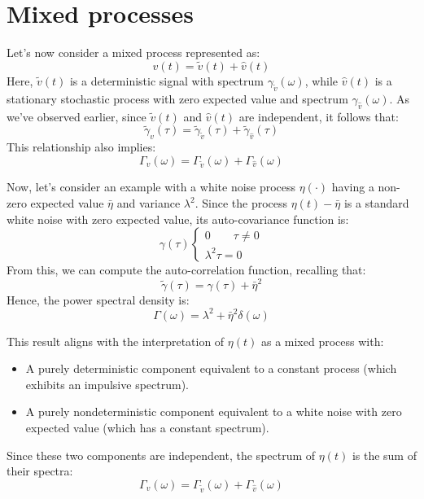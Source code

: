 \section{Mixed processes}

Let's now consider a mixed process represented as:
\[v(t)=\tilde{v}(t)+\widehat{v}(t)\]
Here, $\tilde{v}(t)$ is a deterministic signal with spectrum $\gamma_{\tilde{v}}(\omega)$, while $\widehat{v}(t)$ is a stationary stochastic process with zero expected value and spectrum $\gamma_{\widehat{v}}(\omega)$.
As we've observed earlier, since $\tilde{v}(t)$ and $\widehat{v}(t)$ are independent, it follows that:
\[\tilde{\gamma}_v(\tau)=\tilde{\gamma}_{\tilde{v}}(\tau)+\tilde{\gamma}_{\widehat{v}}(\tau)\]
This relationship also implies:
\[\Gamma_v(\omega)=\Gamma_{\tilde{v}}(\omega)+\Gamma_{\widehat{v}}(\omega)\]
\begin{example}
    Now, let's consider an example with a white noise process $\eta(\cdot)$ having a non-zero expected value $\bar{\eta}$ and variance $\lambda^2$. 
    Since the process $\eta(t)-\bar{\eta}$ is a standard white noise with zero expected value, its auto-covariance function is:
    \[\gamma(\tau)\begin{cases}
        0 \qquad \tau \neq 0 \\
        \lambda^2 \tau = 0
    \end{cases}\]
    From this, we can compute the auto-correlation function, recalling that:
    \[\tilde{\gamma}(\tau)=\gamma(\tau)+\bar{\eta}^2\]
    Hence, the power spectral density is:
    \[\Gamma(\omega)=\lambda^2+\bar{\eta}^2\delta(\omega)\]
\end{example}
This result aligns with the interpretation of $\eta(t)$ as a mixed process with:
\begin{itemize}
    \item A purely deterministic component equivalent to a constant process (which exhibits an impulsive spectrum).
    \item A purely nondeterministic component equivalent to a white noise with zero expected value (which has a constant spectrum).
\end{itemize}
Since these two components are independent, the spectrum of $\eta(t)$ is the sum of their spectra:
\[\Gamma_v(\omega)=\Gamma_{\tilde{v}}(\omega)+\Gamma_{\widehat{v}}(\omega)\]
